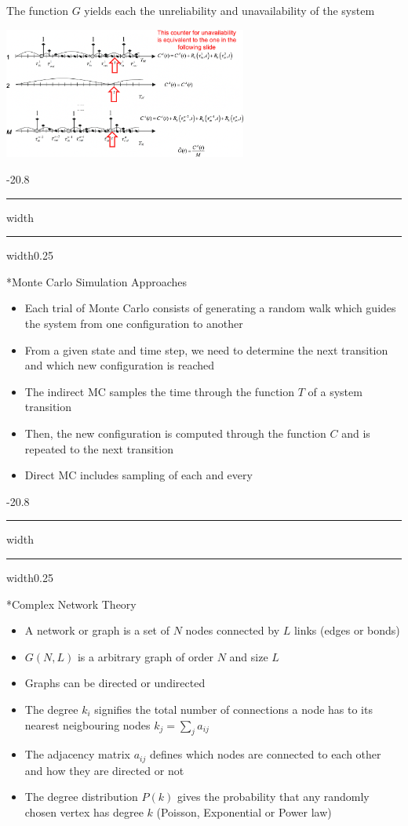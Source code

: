 \documentclass[8pt, landscape, fleqn]{scrartcl}
\makeatletter
\renewcommand{\section}{\@startsection{section}{1}{0mm}%
{-2\baselineskip}{0.8\baselineskip}%
{\hrule depth 0.2pt width\columnwidth\hrule depth1.5pt
width0.25\columnwidth\vspace*{1.2em}\Large\bfseries\rmfamily}}
\renewcommand{\subsection}{\@startsection{subsection}{1}{0mm}%
{-2\baselineskip}{0.8\baselineskip}%
{\hrule depth 0.2pt width\columnwidth\hrule depth0.75pt
width0.25\columnwidth\vspace*{1.2em}\large\bfseries\rmfamily}}
\makeatother
\begin{document}
\begin{multicols*}{3}
The function $G$ yields each the unreliability and unavailability of the system

\includegraphics[width=8cm]{Images/SystemAvailabilityReliability.png}

\subsection*{Monte Carlo Simulation Approaches}

\begin{itemize}
    \item Each trial of Monte Carlo consists of generating a random walk which guides the system from one configuration to another
    \item From a given state and time step, we need to determine the next transition and which new configuration is reached
    \item The indirect MC samples the time through the function $T$ of a system transition
    \item Then, the new configuration is computed through the function $C$ and is repeated to the next transition
    \item Direct MC includes sampling of each and every 
\end{itemize}


\section*{Complex Network Theory}

\begin{itemize}
    \item A network or graph is a set of $N$ nodes connected by $L$ links (edges or bonds)
    \item $G(N,L)$ is a arbitrary graph of order $N$ and size $L$
    \item Graphs can be directed or undirected
    \item The degree $k_i$ signifies the total number of connections a node has to its nearest neigbouring nodes $k_j = \sum_j a_{ij}$
    \item The adjacency matrix $a_{ij}$ defines which nodes are connected to each other and how they are directed or not
    \item The degree distribution $P(k)$ gives the probability that any randomly chosen vertex has degree $k$ (Poisson, Exponential or Power law)
\end{itemize}


\end{multicols*}
\end{document}
